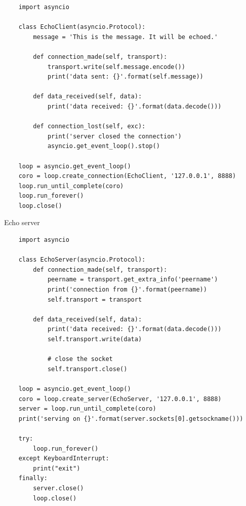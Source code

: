\documentclass[20pt]{beamer}
\begin{document}
\begin{center}
\begin{frame}[fragile]
    \fontsize{8pt}{8pt}\selectfont
    \begin{verbatim}
    import asyncio

    class EchoClient(asyncio.Protocol):
        message = 'This is the message. It will be echoed.'

        def connection_made(self, transport):
            transport.write(self.message.encode())
            print('data sent: {}'.format(self.message))

        def data_received(self, data):
            print('data received: {}'.format(data.decode()))

        def connection_lost(self, exc):
            print('server closed the connection')
            asyncio.get_event_loop().stop()

    loop = asyncio.get_event_loop()
    coro = loop.create_connection(EchoClient, '127.0.0.1', 8888)
    loop.run_until_complete(coro)
    loop.run_forever()
    loop.close()
    \end{verbatim}
\end{frame}

\begin{frame}[fragile]
    Echo server

    \fontsize{8pt}{8pt}\selectfont
    \begin{verbatim}
    import asyncio

    class EchoServer(asyncio.Protocol):
        def connection_made(self, transport):
            peername = transport.get_extra_info('peername')
            print('connection from {}'.format(peername))
            self.transport = transport

        def data_received(self, data):
            print('data received: {}'.format(data.decode()))
            self.transport.write(data)

            # close the socket
            self.transport.close()

    loop = asyncio.get_event_loop()
    coro = loop.create_server(EchoServer, '127.0.0.1', 8888)
    server = loop.run_until_complete(coro)
    print('serving on {}'.format(server.sockets[0].getsockname()))

    try:
        loop.run_forever()
    except KeyboardInterrupt:
        print("exit")
    finally:
        server.close()
        loop.close()
    \end{verbatim}
\end{frame}

\frame{

    \bigskip\bigskip
    \bigskip\bigskip
    \bigskip\bigskip

}
\end{center}
\end{document}
